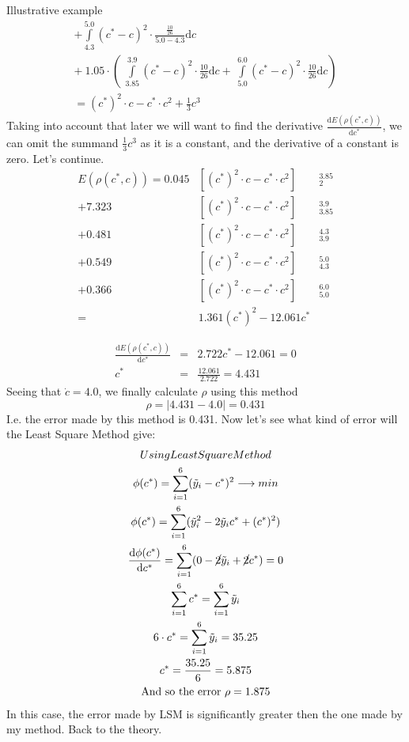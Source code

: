 \documentclass[a4paper]{article}
\numberwithin{equation}{subsection}
\begin{document}
\begin{subsection}{Illustrative example}
\begin{gather*}
+ \int\limits_{4.3}^{5.0} (c^{*}-c)^{2} \cdot \frac{\frac{10}{26}}{5.0-4.3} \mathrm{d}c \\
+ \ 1.05 \cdot \left( \ \int\limits_{3.85}^{3.9} (c^{*}-c)^{2} \cdot \frac{10}{26} \mathrm{d}c + \
\int\limits_{5.0}^{6.0} (c^{*}-c)^{2} \cdot \frac{10}{26} \mathrm{d}c \right) \\
=(c^{*})^{2} \cdot c - c^{*} \cdot c^{2} + \frac{1}{3} c^{3}
\end{gather*}
Taking into account that later we will want to find the derivative $\frac{\mathrm{d}E(\rho(c^{*},c))}{\mathrm{d}c^{*}}$, we can omit the summand $\frac{1}{3} c^{3}$ as it is a constant, and the derivative of a constant is zero. Let's continue.
\begin{eqnarray*}
E(\rho(c^{*},c)) = 0.045 &\left[ (c^{*})^{2} \cdot c - c^{*} \cdot c^{2} \right]&_{2}^{3.85}  \\
+ 7.323  &\left[ (c^{*})^{2} \cdot c - c^{*} \cdot c^{2} \right]&_{3.85}^{3.9} \\
+ 0.481 &\left[ (c^{*})^{2} \cdot c - c^{*} \cdot c^{2} \right]&_{3.9}^{4.3}  \\
+ 0.549 &\left[ (c^{*})^{2} \cdot c - c^{*} \cdot c^{2} \right]&_{4.3}^{5.0}  \\
+ 0.366 &\left[ (c^{*})^{2} \cdot c - c^{*} \cdot c^{2} \right]&_{5.0}^{6.0}  \\
= &1.361(c^{*})^{2}-12.061c^{*}&
\end{eqnarray*}

\begin{eqnarray*}
\frac{\mathrm{d}E(\rho(c^{*},c))}{\mathrm{d}c^{*}} &=& 2.722c^{*}-12.061 = 0 \\
c^{*} &=& \frac{12.061}{2.722} = 4.431
\end{eqnarray*}
Seeing that $\dot{c} = 4.0$, we finally calculate $\rho$ using this method
\begin{equation*}
\rho = |4.431-4.0| = 0.431
\end{equation*}
I.e. the error made by this method is 0.431. Now let's see what kind of error will the Least Square Method give:
\begin{gather*}
Using Least Square Method \\
\phi(c^{*})= \sum\limits_{i=1}^{6}(\tilde{y}_{i}-c^{*})^{2} \longrightarrow min \\
\phi(c^{*})= \sum\limits_{i=1}^{6}(\tilde{y}_{i}^{2}-2 \tilde{y}_{i}c^{*} + (c^{*})^{2}) \\
\frac{\mathrm{d}\phi(c^{*})}{\mathrm{d}c^{*}} =  \sum\limits_{i=1}^{6}(0 -\cancel{2} \tilde{y}_{i} +\cancel{2} c^{*}) = 0 \\
\sum\limits_{i=1}^{6}c^{*} = \sum\limits_{i=1}^{6} \tilde{y}_{i} \\
6 \cdot c^{*} = \sum\limits_{i=1}^{6} \tilde{y}_{i} = 35.25 \\
c^{*} = \frac{35.25}{6} = 5.875 \\
\text{And so the error } \rho = 1.875
\end{gather*}
In this case, the error made by LSM is significantly greater then the one made by my method. Back to the theory.\\
\\
\end{subsection}
\end{document}
